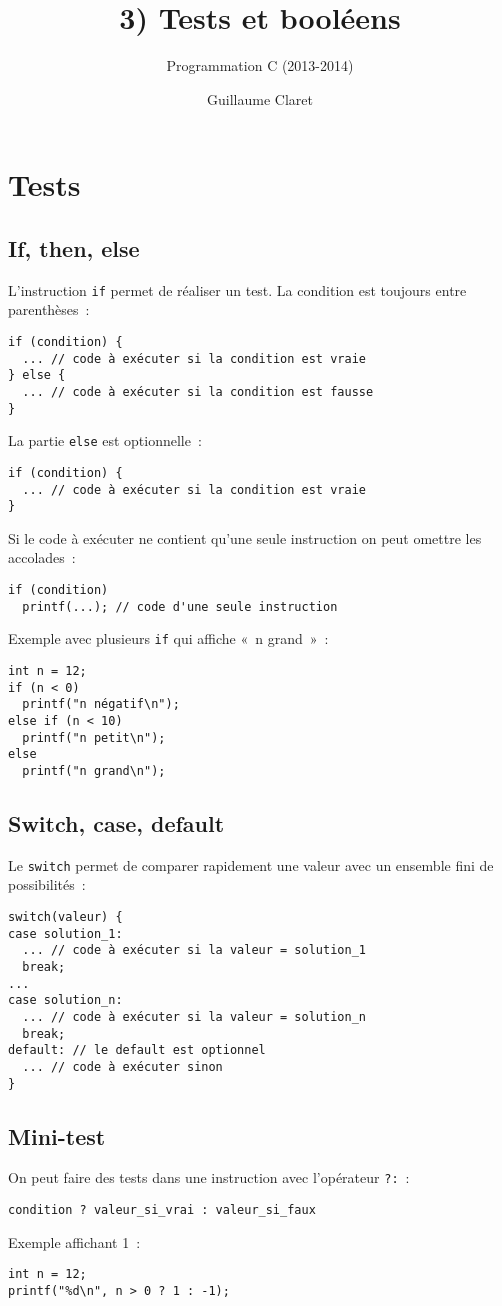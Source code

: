 \documentclass[a4paper,10pt]{article}
\begin{document}
  \title{3) Tests et booléens}
  \author{Programmation C (2013-2014)}
  \date{Guillaume Claret}
  \maketitle
  
  \section{Tests}
  \subsection{If, then, else}
  L'instruction \texttt{if} permet de réaliser un test. La condition est toujours entre parenthèses~:
  \begin{verbatim}
if (condition) {
  ... // code à exécuter si la condition est vraie
} else {
  ... // code à exécuter si la condition est fausse
}
  \end{verbatim}
  La partie \texttt{else} est optionnelle~:
  \begin{verbatim}
if (condition) {
  ... // code à exécuter si la condition est vraie
}
  \end{verbatim}
  Si le code à exécuter ne contient qu'une seule instruction on peut omettre les accolades~:
  \begin{verbatim}
if (condition)
  printf(...); // code d'une seule instruction
  \end{verbatim}
  Exemple avec plusieurs \texttt{if} qui affiche «~n grand~»~:
  \begin{verbatim}
int n = 12;
if (n < 0)
  printf("n négatif\n");
else if (n < 10)
  printf("n petit\n");
else
  printf("n grand\n");
  \end{verbatim}
  
  \newpage
  \subsection{Switch, case, default}
  Le \texttt{switch} permet de comparer rapidement une valeur avec un ensemble fini de possibilités~:
  \begin{verbatim}
switch(valeur) {
case solution_1:
  ... // code à exécuter si la valeur = solution_1
  break;
...
case solution_n:
  ... // code à exécuter si la valeur = solution_n
  break;
default: // le default est optionnel
  ... // code à exécuter sinon
}
  \end{verbatim}
  
  \subsection{Mini-test}
  On peut faire des tests dans une instruction avec l'opérateur \texttt{?:}~:
  \begin{verbatim}
condition ? valeur_si_vrai : valeur_si_faux
  \end{verbatim}
  Exemple affichant 1~:
  \begin{verbatim}
int n = 12;
printf("%d\n", n > 0 ? 1 : -1);
  \end{verbatim}
  
\end{document}
